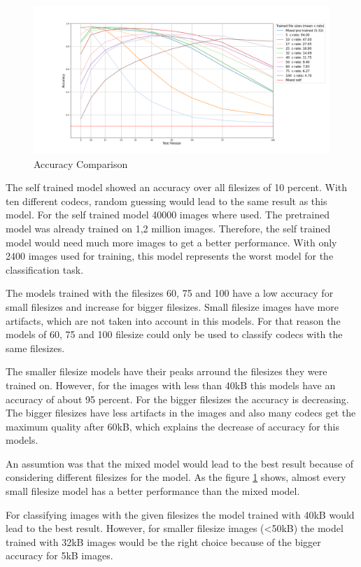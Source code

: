 \documentclass{article}
\begin{document}
\begin{figure}[h!]
	\centering
	\includegraphics[width=12cm]{accuracy_comparison.png}
	\caption{Accuracy Comparison}
	\label{fig: acc_comparison}
\end{figure}

\noindent
The self trained model showed an accuracy over all filesizes of 10 percent. With ten different codecs, random guessing would lead to the same result as this model. For the self trained model 40000 images where used. The pretrained model was already trained on 1,2 million images. Therefore, the self trained model would need much more images to get a better performance. With only 2400 images used for training, this model represents the worst model for the classification task. 

\noindent
The models trained with the filesizes 60, 75 and 100 have a low accuracy for small filesizes and increase for bigger filesizes. Small filesize images have more artifacts, which are not taken into account in this models. For that reason the models of 60, 75 and 100 filesize could only be used to classify codecs with the same filesizes.

\noindent
The smaller filesize models have their peaks arround the filesizes they were trained on. However, for the images with less than 40kB this models have an accuracy of about 95 percent. For the bigger filesizes the accuracy is decreasing. The bigger filesizes have less artifacts in the images and also many codecs get the maximum quality after 60kB, which explains the decrease of accuracy for this models. 

\noindent
An assumtion was that the mixed model would lead to the best result because of considering different filesizes for the model. As the figure \ref{fig: acc_comparison} shows, almost every small filesize model has a better performance than the mixed model. 

\noindent
For classifying images with the given filesizes the model trained with 40kB would lead to the best result. However, for smaller filesize images (\textless 50kB) the model trained with 32kB images would be the right choice because of the bigger accuracy for 5kB images.
\end{document}
